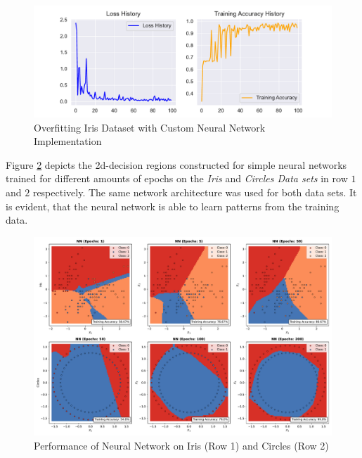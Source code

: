 \begin{figure}[ht!]
\centering
\includegraphics[scale=0.8]{figures/assert_nn_overfit.pdf}
\captionsetup{justification=centering,margin=2cm}
\caption{Overfitting Iris Dataset with Custom Neural Network Implementation}
\label{assert_nn_overfit}
\end{figure}

Figure \ref{assert_nn_toydata} depicts the 2d-decision regions constructed for simple neural networks trained for different amounts of epochs on the \textit{Iris} and \textit{Circles Data sets} in row $1$ and $2$ respectively. The same network architecture was used for both data sets. It is evident, that the neural network is able to learn patterns from the training data.

\begin{figure}[ht!]
\centering
\includegraphics[scale=0.37]{figures/assert_nn_toydata.pdf}
\captionsetup{justification=centering,margin=2cm}
\caption{Performance of Neural Network on Iris (Row 1) and Circles (Row 2)}
\label{assert_nn_toydata}
\end{figure}